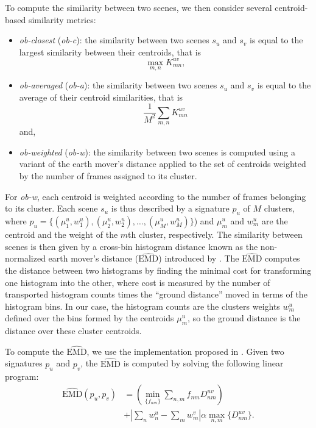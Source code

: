 \documentclass[journal]{IEEEtran}
\newcommand*{\EMD}{\mathrm{EMD}}
\begin{document}
To compute the similarity between two scenes, we then consider several centroid-based similarity metrics:
\begin{itemize}
\item \emph{ob-closest} (\emph{ob-c}): the similarity between two scenes $s_u$ and $s_v$ is equal to the largest similarity between their centroids, that is
\begin{equation}
	\max_{m,n} K_{mn}^{uv},
\end{equation}
\item \emph{ob-averaged} (\emph{ob-a}): the similarity between two scenes $s_u$ and $s_v$ is equal to the average of their centroid similarities, that is
\begin{equation}
	\frac{1}{M^2} \sum_{m,n} K_{mn}^{uv}
\end{equation}
and,
\item \emph{ob-weighted} (\emph{ob-w}): the similarity between two scenes is computed using a variant of the earth mover's distance applied to the set of centroids weighted by the number of frames assigned to its cluster.
\end{itemize}

For \emph{ob-w}, each centroid is weighted according to the number of frames belonging to its cluster. Each scene $s_u$ is thus described by a signature $p_u$ of $M$ clusters, where $p_u=\lbrace(\mu_1^u,w_1^u),(\mu_2^u,w_2^u),\ldots,(\mu_M^u,w_M^u)\rbrace$) and $\mu_m^u$ and $w_m^u$ are the centroid and the weight of the $m$th cluster, respectively. The similarity between scenes is then given by a cross-bin histogram distance known as the non-normalized earth mover's distance ($\widehat{\EMD}$) introduced by \cite{pele2008linear}. The $\widehat{\EMD}$ computes the distance between two histograms by finding the minimal cost for transforming one histogram into the other, where cost is measured by the number of transported histogram counts times the ``ground distance'' moved in terms of the histogram bins. In our case, the histogram counts are the clusters weights $w_m^u$ defined over the bins formed by the centroids $\mu_m^u$, so the ground distance is the distance over these cluster centroids.

To compute the $\widehat{\EMD}$, we use the implementation proposed in \cite{pele2009fast}. Given two signatures $p_u$ and $p_v$, the $\widehat{\EMD}$ is computed by solving the following linear program:
\begin{equation}
\begin{split}
\widehat{\EMD}(p_u,p_v) &=\left( \min\limits_{\lbrace f_{nm}\rbrace} \sum\limits_{n,m} f_{nm}D_{nm}^{uv} \right) \\
&+ \left|\sum\limits_{n} w_n^u - \sum\limits_{m} w_m^v  \right| \alpha \max\limits_{n,m}\lbrace  D_{nm}^{uv}\rbrace.
\end{split}
\end{equation}
\end{document}
